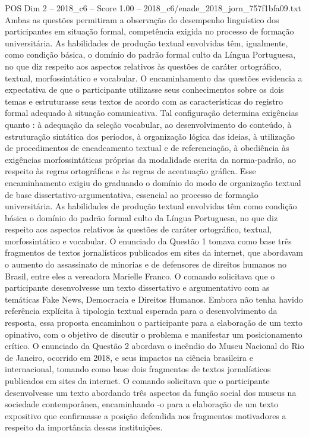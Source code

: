 \begin{textsample}{POS Dim 2 – 2018\_c6 – Score 1.00 – 2018\_c6/enade\_2018\_jorn\_757f1bfa09.txt}
Ambas as questões permitiram a observação do desempenho linguístico dos participantes em situação formal, competência exigida no processo de formação universitária.
As habilidades de produção textual envolvidas têm, igualmente, como condição básica, o domínio do padrão formal culto da Língua Portuguesa, no que diz respeito aos aspectos relativos às questões de caráter ortográfico, textual, morfossintático e vocabular.
O encaminhamento das questões evidencia a expectativa de que o participante utilizasse seus conhecimentos sobre os dois temas e estruturasse seus textos de acordo com as características do registro formal adequado à situação comunicativa.
Tal configuração determina exigências quanto : à adequação da seleção vocabular, ao desenvolvimento do conteúdo, à estruturação sintática dos períodos, à organização lógica das ideias, à utilização de procedimentos de encadeamento textual e de referenciação, à obediência às exigências morfossintáticas próprias da modalidade escrita da norma-padrão, ao respeito às regras ortográficas e às regras de acentuação gráfica.
Esse encaminhamento exigiu do graduando o domínio do modo de organização textual de base dissertativo-argumentativa, essencial ao processo de formação universitária.
As habilidades de produção textual envolvidas têm como condição básica o domínio do padrão formal culto da Língua Portuguesa, no que diz respeito aos aspectos relativos às questões de caráter ortográfico, textual, morfossintático e vocabular.
O enunciado da Questão 1 tomava como base três fragmentos de textos jornalísticos publicados em sites da internet, que abordavam o aumento do assassinato de minorias e de defensores de direitos humanos no Brasil, entre eles a vereadora Marielle Franco.
O comando solicitava que o participante desenvolvesse um texto dissertativo e argumentativo com as temáticas Fake News, Democracia e Direitos Humanos.
Embora não tenha havido referência explícita à tipologia textual esperada para o desenvolvimento da resposta, essa proposta encaminhou o participante para a elaboração de um texto opinativo, com o objetivo de discutir o problema e manifestar um posicionamento crítico.
O enunciado da Questão 2 abordava o incêndio do Museu Nacional do Rio de Janeiro, ocorrido em 2018, e seus impactos na ciência brasileira e internacional, tomando como base dois fragmentos de textos jornalísticos publicados em sites da internet.
O comando solicitava que o participante desenvolvesse um texto abordando três aspectos da função social dos museus na sociedade contemporânea, encaminhando -o para a elaboração de um texto expositivo que confirmasse a posição defendida nos fragmentos motivadores a respeito da importância dessas instituições.

\end{textsample}
